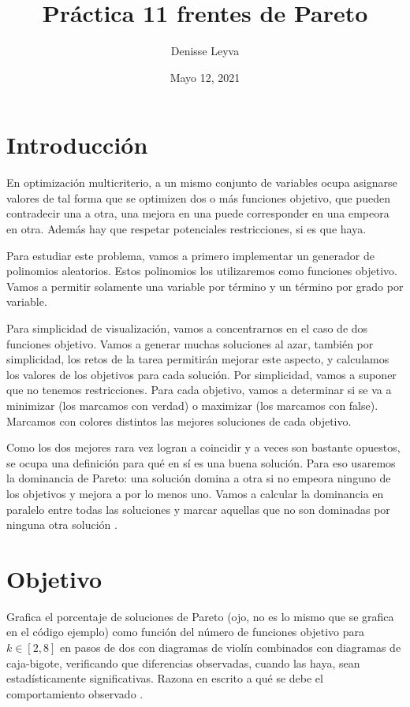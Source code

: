 \documentclass{article}
\title{Práctica 11 frentes de Pareto}
\author{Denisse Leyva}
\date{Mayo 12, 2021}
\begin{document}
\maketitle


\section{Introducción}
En optimización multicriterio, a un mismo conjunto de variables ocupa asignarse valores de tal forma que se optimizen dos o más funciones objetivo, que pueden contradecir una a otra, una mejora en una puede corresponder en una empeora en otra. Además hay que respetar potenciales restricciones, si es que haya.

Para estudiar este problema, vamos a primero implementar un generador de polinomios aleatorios. Estos polinomios los utilizaremos como funciones objetivo. Vamos a permitir solamente una variable por término y un término por grado por variable.

Para simplicidad de visualización, vamos a concentrarnos en el caso de dos funciones objetivo. Vamos a generar muchas soluciones al azar, también por simplicidad, los retos de la tarea permitirán mejorar este aspecto, y calculamos los valores de los objetivos para cada solución. Por simplicidad, vamos a suponer que no tenemos restricciones.
Para cada objetivo, vamos a determinar si se va a minimizar (los marcamos con verdad) o maximizar (los marcamos con false). Marcamos con colores distintos las mejores soluciones de cada objetivo.

Como los dos mejores rara vez logran a coincidir y a veces son bastante opuestos, se ocupa una definición para qué en sí es una buena solución. Para eso usaremos la dominancia de Pareto: una solución domina a otra si no empeora ninguno de los objetivos y mejora a por lo menos uno. Vamos a calcular la dominancia en paralelo entre todas las soluciones y marcar aquellas que no son dominadas por ninguna otra solución \cite{Satu_Elisa_Schaeffer}.

\section{Objetivo}
Grafica el porcentaje de soluciones de Pareto (ojo, no es lo mismo que se grafica en el código ejemplo) como función del número de funciones objetivo para $k \in [2, 8]$  en pasos de dos con diagramas de violín combinados con diagramas de caja-bigote, verificando que diferencias observadas, cuando las haya, sean estadísticamente significativas. Razona en escrito a qué se debe el comportamiento observado \cite{Satu_Elisa_Schaeffer}.
\end{document}

